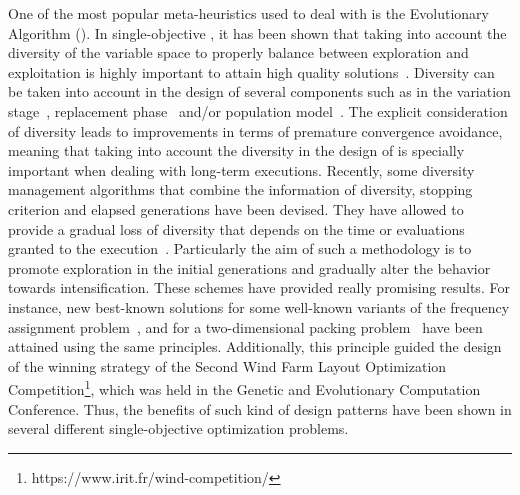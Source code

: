 One of the most popular meta-heuristics used to deal with \MOPS{} is the Evolutionary Algorithm (\EA{}).
%
In single-objective \EAS{}, it has been shown that taking into account the diversity of the variable space
to properly balance between exploration and exploitation is highly important to attain high quality 
solutions~\cite{Joel:BALANCE_DIVERSITY}.
%
Diversity can be taken into account in the design of several components such as in the variation 
stage~\cite{Joel:FUZZY_ADAPTIVE_GA,Joel:CROSSOVER_DIVERSITY}, replacement phase~\cite{Joel:MULTI_DYNAMIC} 
and/or population model~\cite{Joel:SAWTOOTH}.
%
%
The explicit consideration of diversity leads to improvements in terms of premature convergence avoidance, 
meaning that taking into account the diversity in the design of \EAS{} is specially important when dealing 
with long-term executions.
%
Recently, some diversity management algorithms that combine the information of diversity, stopping criterion and elapsed 
generations have been devised.
%
They have allowed to provide a gradual loss of diversity that depends on the time or evaluations granted to the 
execution~\cite{Joel:MULTI_DYNAMIC}.
%
Particularly the aim of such a methodology is to promote exploration in the initial generations and gradually alter the 
behavior towards intensification.
%
These schemes have provided really promising results.
%
For instance, new best-known solutions for some well-known variants of the frequency assignment problem~\cite{Segura:17},
and for a two-dimensional packing problem~\cite{Joel:MULTI_DYNAMIC} have been attained using the same principles.
%
Additionally, this principle guided the design of the winning strategy of the Second Wind Farm Layout Optimization 
Competition\footnote{https://www.irit.fr/wind-competition/}, which was held in the Genetic and Evolutionary 
Computation Conference.
%
Thus, the benefits of such kind of design patterns have been shown in several different single-objective optimization problems.


